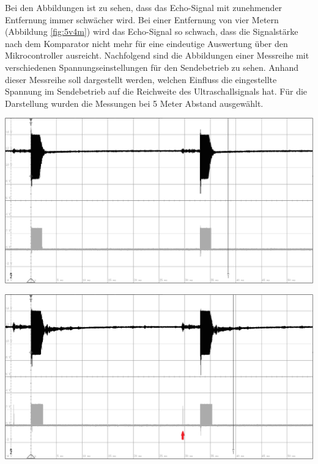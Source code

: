 Bei den Abbildungen ist zu sehen, dass das Echo-Signal mit zunehmender Entfernung immer schwächer wird. Bei einer Entfernung von vier Metern (Abbildung \ref{fig:5v4m}) wird das Echo-Signal so schwach, dass die Signalstärke nach dem Komparator nicht mehr für eine eindeutige Auswertung über den Mikrocontroller ausreicht. Nachfolgend sind die Abbildungen einer Messreihe mit verschiedenen Spannungseinstellungen für den Sendebetrieb zu sehen. Anhand dieser Messreihe soll dargestellt werden, welchen Einfluss die eingestellte Spannung im Sendebetrieb auf die Reichweite des Ultraschallsignals hat. Für die Darstellung wurden die Messungen bei 5 Meter Abstand ausgewählt.\\
\begin{minipage}{0.46\textwidth}
\includegraphics[width=1\textwidth%
]{Abbildungen/MessungenP2/5V/5m.PNG}
\label{fig:5v5m2}
\end{minipage}\qquad
\begin{minipage}{0.46\textwidth}
\includegraphics[width=1\textwidth%
]{Abbildungen/MessungenP2/10V/5mb.PNG}
\label{fig:10v5m}
\end{minipage}\\

